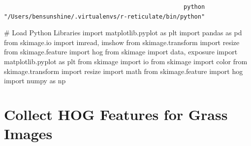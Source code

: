 \documentclass[
  letterpaper,
  DIV=11,
  numbers=noendperiod]{scrreprt}
\newenvironment{Shaded}{\begin{snugshade}}{\end{snugshade}}
\newcommand{\CommentTok}[1]{\textcolor[rgb]{0.37,0.37,0.37}{#1}}
\newcommand{\ImportTok}[1]{\textcolor[rgb]{0.00,0.46,0.62}{#1}}
\newcommand{\NormalTok}[1]{\textcolor[rgb]{0.00,0.23,0.31}{#1}}
\begin{document}
\begin{verbatim}
                                                   python 
"/Users/bensunshine/.virtualenvs/r-reticulate/bin/python" 
\end{verbatim}

\begin{Shaded}
\begin{Highlighting}[]
\CommentTok{\# Load Python Libraries}
\ImportTok{import}\NormalTok{ matplotlib.pyplot }\ImportTok{as}\NormalTok{ plt}
\ImportTok{import}\NormalTok{ pandas }\ImportTok{as}\NormalTok{ pd}
\ImportTok{from}\NormalTok{ skimage.io }\ImportTok{import}\NormalTok{ imread, imshow}
\ImportTok{from}\NormalTok{ skimage.transform }\ImportTok{import}\NormalTok{ resize}
\ImportTok{from}\NormalTok{ skimage.feature }\ImportTok{import}\NormalTok{ hog}
\ImportTok{from}\NormalTok{ skimage }\ImportTok{import}\NormalTok{ data, exposure}
\ImportTok{import}\NormalTok{ matplotlib.pyplot }\ImportTok{as}\NormalTok{ plt}
\ImportTok{from}\NormalTok{ skimage }\ImportTok{import}\NormalTok{ io}
\ImportTok{from}\NormalTok{ skimage }\ImportTok{import}\NormalTok{ color}
\ImportTok{from}\NormalTok{ skimage.transform }\ImportTok{import}\NormalTok{ resize}
\ImportTok{import}\NormalTok{ math}
\ImportTok{from}\NormalTok{ skimage.feature }\ImportTok{import}\NormalTok{ hog}
\ImportTok{import}\NormalTok{ numpy }\ImportTok{as}\NormalTok{ np}
\end{Highlighting}
\end{Shaded}

\section{Collect HOG Features for Grass
Images}\label{collect-hog-features-for-grass-images}
\end{document}
